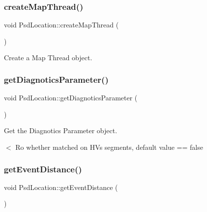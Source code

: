 \mbox{\label{class_psd_location_a5a7754d385e2b97c9b1e154e02dc0686}} 
\subsubsection{\texorpdfstring{create\+Map\+Thread()}{createMapThread()}}
{\footnotesize\ttfamily void Psd\+Location\+::create\+Map\+Thread (\begin{DoxyParamCaption}{ }\end{DoxyParamCaption})}



Create a Map Thread object. 

\mbox{\label{class_psd_location_adf19a491291327b33c1101deb91fe64f}} 
\subsubsection{\texorpdfstring{get\+Diagnotics\+Parameter()}{getDiagnoticsParameter()}}
{\footnotesize\ttfamily void Psd\+Location\+::get\+Diagnotics\+Parameter (\begin{DoxyParamCaption}{ }\end{DoxyParamCaption})}



Get the Diagnotics Parameter object. 

$<$ Ro whether matched on HV\textquotesingle{}s segments, default value == false \mbox{\label{class_psd_location_acb88267ba5337c7d06687b3121930bc0}} 
\subsubsection{\texorpdfstring{get\+Event\+Distance()}{getEventDistance()}}
{\footnotesize\ttfamily void Psd\+Location\+::get\+Event\+Distance (\begin{DoxyParamCaption}{ }\end{DoxyParamCaption})}




